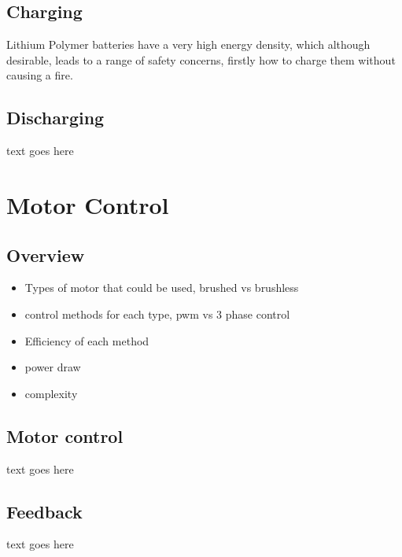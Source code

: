 \documentclass[journal,10pt]{IEEEtran}
\begin{document}
	\subsection{Charging}
		Lithium Polymer batteries have a very high energy density, which although desirable, leads to a range of safety concerns, firstly how to charge them without causing a fire.
	\subsection{Discharging}
		text goes here
\section{Motor Control}
	\subsection{Overview}
		\begin{itemize}
			\item Types of motor that could be used, brushed vs brushless
			\item control methods for each type, pwm vs 3 phase control
			\item Efficiency of each method
			\item power draw
			\item complexity
		\end{itemize}
	\subsection{Motor control}
		text goes here
	\subsection{Feedback}
		text goes here
\end{document}
